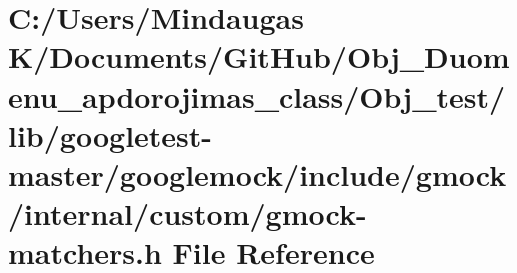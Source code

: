 \hypertarget{_obj__test_2lib_2googletest-master_2googlemock_2include_2gmock_2internal_2custom_2gmock-matchers_8h}{}\section{C\+:/\+Users/\+Mindaugas K/\+Documents/\+Git\+Hub/\+Obj\+\_\+\+Duomenu\+\_\+apdorojimas\+\_\+class/\+Obj\+\_\+test/lib/googletest-\/master/googlemock/include/gmock/internal/custom/gmock-\/matchers.h File Reference}
\label{_obj__test_2lib_2googletest-master_2googlemock_2include_2gmock_2internal_2custom_2gmock-matchers_8h}
